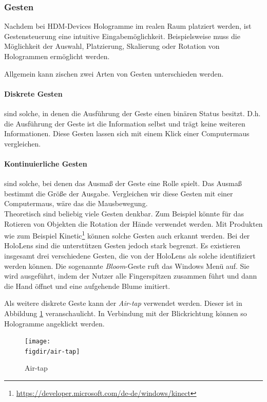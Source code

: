 \subsubsection*{Gesten}
Nachdem bei HDM-Devices Hologramme im realen Raum platziert werden, ist Gestensteuerung eine intuitive Eingabemöglichkeit. Beispielsweise muss die Möglichkeit der Auswahl, Platzierung, Skalierung oder Rotation von Hologrammen ermöglicht werden.

Allgemein kann zischen zwei Arten von Gesten unterschieden werden.

\paragraph{Diskrete Gesten} sind solche, in denen die Ausführung der Geste einen binären Status besitzt. D.h. die Ausführung der Geste ist die Information selbst und trägt keine weiteren Informationen. Diese Gesten lassen sich mit einem Klick einer Computermaus vergleichen.

\paragraph{Kontinuierliche Gesten} sind solche, bei denen das Ausmaß der Geste eine Rolle spielt. Das Ausmaß bestimmt die Größe der Ausgabe. Vergleichen wir diese Gesten mit einer Computermaus, wäre das die Mausbewegung.\\

Theoretisch sind beliebig viele Gesten denkbar. Zum Beispiel könnte für das Rotieren von Objekten die Rotation der Hände verwendet werden. Mit Produkten wie zum Beispiel Kinetic\footnote{\url{https://developer.microsoft.com/de-de/windows/kinect}} können solche Gesten auch erkannt werden. Bei der HoloLens sind die unterstützen Gesten jedoch stark begrenzt. Es existieren insgesamt drei verschiedene Gesten, die von der HoloLens als solche identifiziert werden können. Die sogenannte \textit{Bloom}-Geste ruft das Windows Menü auf. Sie wird ausgeführt, indem der Nutzer alle Fingerspitzen zusammen führt und dann die Hand öffnet und eine aufgehende Blume imitiert.

Als weitere diskrete Geste kann der \textit{Air-tap} verwendet werden. Dieser ist in Abbildung \ref{fig:air-tap} veranschaulicht. In Verbindung mit der Blickrichtung können so Hologramme angeklickt werden.

\begin{figure}[htb]
  \texttt{[image: \\figdir/air-tap]}
  \caption{Air-tap \cite{windows2017gesture}}
  \label{fig:air-tap}
\end{figure}


